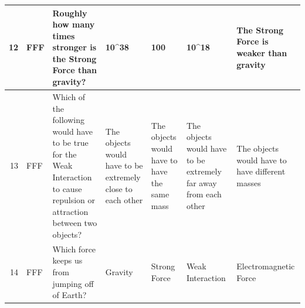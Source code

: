 \documentclass[10pt]{article}
\begin{document}
\begin{tiny}
\begin{longtable}{r|p{0.375in}|p{1.275in}|p{0.75in}|p{0.75in}|p{0.75in}|p{0.75in}}
    12    &     FFF &                                                                                                                                                                                                                Roughly how many times stronger is the Strong Force than gravity? &                                                                                                                                 10\textasciicircum 38 &                                                                                                   100 &                                                                                                                      10\textasciicircum 18 &                                                                                           The Strong Force is weaker than gravity \\\hline
    13    &     FFF &                                                                                                                                                      Which of the following would have to be true for the Weak Interaction to cause repulsion or attraction between two objects? &                                                                            The objects would have to be extremely close to each other &                                                          The objects would have to have the same mass &                                                            The objects would have to be extremely far away from each other &                                                                                   The objects would have to have different masses \\\hline
    14    &     FFF &                                                                                                                                                                                                                                  Which force keeps us from jumping off of Earth? &                                                                                                                               Gravity &                                                                                          Strong Force &                                                                                                           Weak Interaction &                                                                                                             Electromagnetic Force \\\hline

\end{longtable}
\end{tiny}
\end{document}
